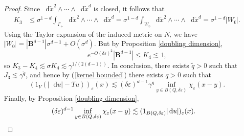 \documentclass[reqno,12pt,letterpaper]{amsart}
\newcommand{\Ball}{\mathbf{B}}
\newcommand*\dif{\mathop{}\!\mathrm{d}}
\theoremstyle{definition}
\numberwithin{equation}{section}
\begin{document}
\begin{proof}
Since $\dif \tilde x^2 \wedge \cdots \wedge \dif \tilde x^d$ is closed, it follows that
\begin{align*}
K_3 &\leq \sigma^{1 - d} \int_{\Gamma_+} \dif \tilde x^2 \wedge \cdots \wedge \dif \tilde x^d = \sigma^{1 - d} \int_{W_0} \dif \tilde x^2 \wedge \cdots \wedge \dif \tilde x^d = \sigma^{1 - d} |W_0|.
\end{align*}
Using the Taylor expansion of the induced metric on $N$, we have $|W_0| = |\Ball^{d - 1}| \sigma^{d - 1} + O(\sigma^d)$.
But by Proposition \ref{doubling dimension},
$$e^{-O(\delta\varepsilon)^2} |\Ball^{d - 1}| \leq K_4 \lesssim 1,$$
so $K_3 - K_4 \lesssim \sigma K_4 \lesssim \gamma^{1/(2(d - 1))}$.
In conclusion, there exists $\tilde q > 0$ such that $J_3 \lesssim \gamma^{\tilde q}$, and hence by (\ref{kernel bounded}) there exists $q > 0$ such that
$$(1_V(|\dif u| - Tu))_\varepsilon(x) \lesssim (\delta\varepsilon)^{d - 1} \gamma^q \inf_{y \in B(Q, \delta\varepsilon)} \chi_\varepsilon(x - y).$$
Finally, by Proposition \ref{doubling dimension},
\begin{align*}
(\delta\varepsilon)^{d - 1} \inf_{y \in B(Q, \delta\varepsilon)} \chi_\varepsilon(x - y) &\lesssim (1_{B(Q, \delta\varepsilon)} |\dif u|)_\varepsilon(x). \qedhere
\end{align*}
\end{proof}
\end{document}
